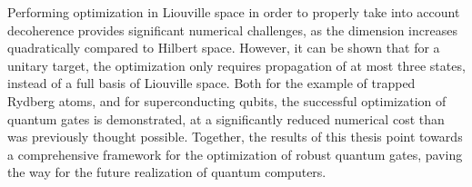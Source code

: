 Performing optimization in Liouville space in order to properly take into
account decoherence provides significant numerical challenges, as the dimension
increases quadratically compared to Hilbert space. However, it can be shown that
for a unitary target, the optimization only requires propagation of at most
three states, instead of a full basis of Liouville space. Both for the example
of trapped Rydberg atoms, and for superconducting qubits, the
successful optimization of quantum gates is demonstrated, at a significantly
reduced numerical cost than was previously thought possible. Together, the
results of this thesis point towards a comprehensive framework for the
optimization of robust quantum gates, paving the way for the future
realization of quantum computers.
